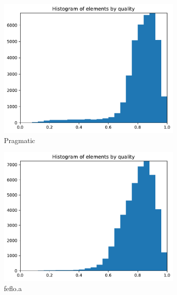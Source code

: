 \documentclass[3p,times,procedia,number]{elsarticle}
\begin{document}
\begin{figure}
\begin{subfigure}{.16\textwidth}
\includegraphics[width=\textwidth]{pragmatic-cube-cylinder-linear-quality.pdf}
\caption{Pragmatic}
\end{subfigure}
\begin{subfigure}{.16\textwidth}
\centering
\includegraphics[width=\textwidth]{fefloa-cube-cylinder-linear-quality.pdf}
\caption{feflo.a}
\end{subfigure}
\begin{subfigure}{.16\textwidth}
\centering

\end{subfigure}
\end{figure}
\end{document}
